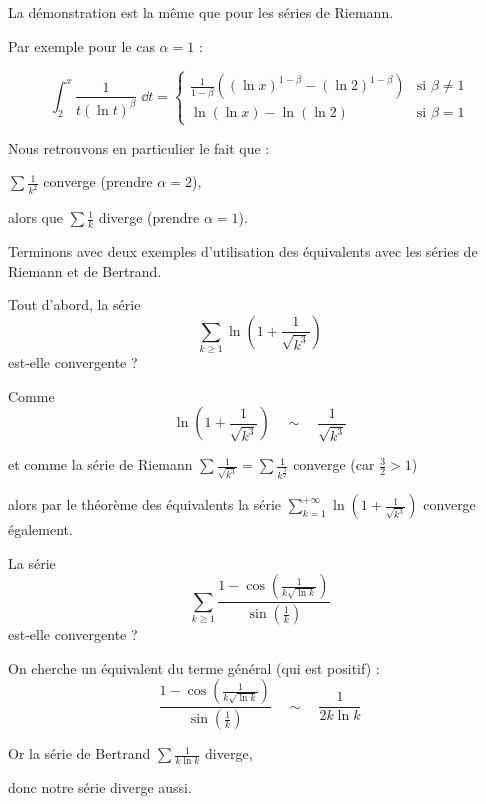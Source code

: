 \change
La démonstration est la même que pour les séries de Riemann.

\change
Par exemple pour le cas $\alpha=1$ : 

\change
$$
\int_2^{x} \frac{1}{t(\ln t)^{\beta}}\;\dd t =
\left\{\begin{array}{ll}
\displaystyle{\frac{1}{1-\beta}\left((\ln x)^{1-\beta}-(\ln 2)^{1-\beta}\right)}&\text{si }\beta\neq
    1\\[1.5ex]
\ln(\ln x)-\ln(\ln 2) &\text{si }\beta=1
\end{array}\right. 
$$

\diapo

Nous retrouvons en particulier le fait que :

 $\sum \frac{1}{k^2}$ converge (prendre $\alpha=2$),

\change
alors que $\sum \frac{1}{k}$ diverge (prendre $\alpha=1$).

\change
Terminons avec deux exemples d'utilisation des équivalents 
avec les séries de Riemann et de Bertrand.

Tout d'abord, la série 
  $$\sum_{k \ge 1} \ln\left(1+\frac{1}{\sqrt{k^3}}\right)$$ 
  est-elle convergente ?
 
\change 
Comme
 $$\ln\left(1+\frac{1}{\sqrt{k^3}}\right) \quad \sim \quad \frac{1}{\sqrt{k^3}}$$
  
\change  
et comme la série de Riemann $\sum \frac{1}{\sqrt{k^3}}=\sum \frac{1}{k^{\frac32}}$ converge (car $\frac32>1$) 

\change
alors par le théorème des équivalents la série $\sum_{k=1}^{+\infty} \ln\left(1+\frac{1}{\sqrt{k^3}}\right)$ converge également.

\diapo
 La série
$$\sum_{k \ge 1} 
\frac{1-\cos\left(\frac{1}{k\sqrt{\ln k}}\right)}{\sin\left(\frac{1}{k}\right)}$$
est-elle convergente ?

\change 
On cherche un équivalent du terme général (qui est positif) :  
$$\frac{1-\cos\left(\frac{1}{k\sqrt{\ln k}}\right)}
{\sin\left(\frac{1}{k}\right)} \quad \sim \quad \frac{1}{2k\ln k}$$

\change
Or la série de Bertrand $\sum \frac{1}{k\ln k}$ diverge, 

\change
donc
notre série diverge aussi.

\diapo



